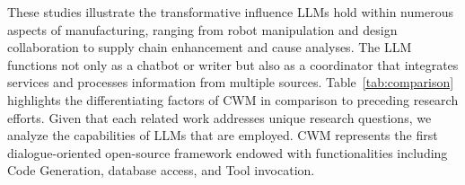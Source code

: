 \documentclass[preprint,12pt]{elsarticle}
\begin{document}
These studies illustrate the transformative influence LLMs hold within numerous aspects of manufacturing, ranging from robot manipulation and design collaboration to supply chain enhancement and cause analyses.
The LLM functions not only as a chatbot or writer but also as a coordinator that integrates services and processes information from multiple sources.
Table~\ref{tab:comparison} highlights the differentiating factors of CWM in comparison to preceding research efforts. 
Given that each related work addresses unique research questions, we analyze the capabilities of LLMs that are employed. 
CWM represents the first dialogue-oriented open-source framework endowed with functionalities including Code Generation, database access, and Tool invocation.
\end{document}
